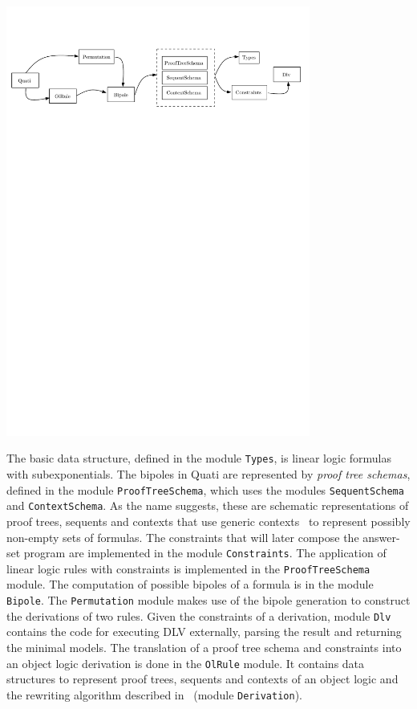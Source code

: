 \documentclass{llncs}
\begin{document}
\begin{center}
\includegraphics[width=10cm]{figures/modulos-simple.pdf} 
\end{center}

% 

The basic data structure, defined in the module \texttt{Types}, is linear logic
formulas with subexponentials. The bipoles in Quati are represented by
\emph{proof tree schemas}, defined in the module \texttt{ProofTreeSchema}, which
uses the modules \texttt{SequentSchema} and \texttt{ContextSchema}. As the name
suggests, these are schematic representations of proof trees, sequents and
contexts that use generic contexts~\cite{nigam13iclp} to represent possibly
non-empty sets of formulas. 
The constraints that will
later compose the answer-set program are implemented in the module \texttt{Constraints}.
The application of linear logic rules with constraints is implemented in the
\texttt{ProofTreeSchema} module.
%
The computation of possible bipoles of a formula is in the module
\texttt{Bipole}. The \texttt{Permutation} module makes use of the bipole
generation to construct the derivations of two rules. Given the
constraints of a derivation, module \texttt{Dlv} contains the code
for executing DLV externally, parsing the result and returning the minimal
models. 
%
The translation of a proof tree schema and constraints into an object logic
derivation is done in the \texttt{OlRule} module. It contains data structures to
represent proof trees, sequents and contexts of an object logic and the
rewriting algorithm described in~\cite{nigam13iclp} (module \texttt{Derivation}).
\end{document}
